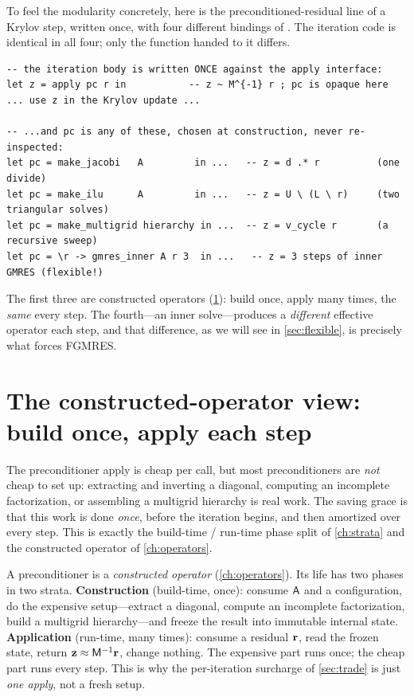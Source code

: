 To feel the modularity concretely, here is the preconditioned-residual line of a Krylov
step, written once, with four different bindings of . The iteration code is
identical in all four; only the function handed to it differs.

\begin{lstlisting}[style=l4style]
-- the iteration body is written ONCE against the apply interface:
let z = apply pc r in           -- z ~ M^{-1} r ; pc is opaque here
... use z in the Krylov update ...

-- ...and pc is any of these, chosen at construction, never re-inspected:
let pc = make_jacobi   A         in ...   -- z = d .* r          (one divide)
let pc = make_ilu      A         in ...   -- z = U \ (L \ r)     (two triangular solves)
let pc = make_multigrid hierarchy in ...  -- z = v_cycle r       (a recursive sweep)
let pc = \r -> gmres_inner A r 3  in ...   -- z = 3 steps of inner GMRES (flexible!)
\end{lstlisting}

The first three are constructed operators (\cref{sec:constructed}): build once, apply many
times, the \emph{same}  every step. The fourth---an inner solve---produces a
\emph{different} effective operator each step, and that difference, as we will see in
\cref{sec:flexible}, is precisely what forces FGMRES.

\section{The constructed-operator view: build once, apply each step}
\label{sec:constructed}

The preconditioner apply is cheap per call, but most preconditioners are \emph{not} cheap
to set up: extracting and inverting a diagonal, computing an incomplete factorization, or
assembling a multigrid hierarchy is real work. The saving grace is that this work is done
\emph{once}, before the iteration begins, and then amortized over every step. This is
exactly the build-time / run-time phase split of \cref{ch:strata} and the constructed
operator of \cref{ch:operators}.

\begin{keyidea}
A preconditioner is a \emph{constructed operator} (\cref{ch:operators}). Its life has two
phases in two strata. \textbf{Construction} (build-time, once): consume $\mathsf{A}$ and a
configuration, do the expensive setup---extract a diagonal, compute an incomplete
factorization, build a multigrid hierarchy---and freeze the result into immutable internal
state. \textbf{Application} (run-time, many times): consume a residual $\mathbf{r}$, read the
frozen state, return $\mathbf{z}\approx\mathsf{M}^{-1}\mathbf{r}$, change nothing. The expensive part runs
once; the cheap part runs every step. This is why the per-iteration surcharge of
\cref{sec:trade} is just \emph{one apply}, not a fresh setup.
\end{keyidea}

